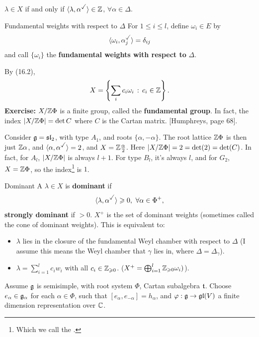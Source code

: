 \documentclass{article}
\begin{document}
\begin{fancylem}{}
    $\lambda \in X$ if and only if $\langle \lambda, \alpha^{\checked} \rangle \in \bbZ$, $\forall \alpha \in \Delta$.
\end{fancylem}
\begin{fancydefine}{Fundamental weights with respect to $\Delta$}
    For $1 \leq i \leq l$, define $\omega_{i} \in E$ by \[ \langle \omega_{i}, \alpha_{j}^{\checked} \rangle = \delta_{ij}\]
    and call $\{ \omega_{i} \}$ the \textbf{fundamental weights with respect to} $\Delta$.
\end{fancydefine}
By (16.2), \[ X= \left\{ \sum_{i} c_{i} \omega_{i} \, : \, c_{i} \in \mathbb{Z}\right\}. \]
\textbf{Exercise: }$X/\mathbb{Z}\Phi$ is a finite group, called the \textbf{fundamental group}. In fact, the index $|X/\mathbb{Z}\Phi| = \det C$ where $C$ is the Cartan matrix. [Humphreys, page 68].
\begin{ex*}
    Consider $\mathfrak{g} = \mathfrak{sl}_{2}$, with type $A_{1}$, and roots $\{\alpha, -\alpha\}$. The root lattice $\mathbb{Z}\Phi$ is then just $\mathbb{Z}\alpha$, and $\langle \alpha, \alpha^{\checked} \rangle = 2$, and $X = \mathbb{Z} \frac{\alpha}{2}$. Here $|X/\mathbb{Z}\Phi|=2=\det(2) = \det(C)$. In fact, for $A_{l}$, $|X/\mathbb{Z}\Phi|$ is always $l+1$. For type $B_{l}$, it's always $l$, and for $G_{2}$, $X=\mathbb{Z}\Phi$, so the index\footnote{Which we call the .} is $1$.
\end{ex*}
\begin{fancydefine}{Dominant}
    A $\lambda \in X$ is \textbf{dominant} if \[
        \langle \lambda, \alpha^{\checked} \rangle \geq 0, \, \, \forall \alpha \in \Phi^{+},\]
        \textbf{strongly dominant} if $>0$. $X^{+}$ is the set of dominant weights (sometimes called the cone of dominant weights). This is equivalent to: \begin{itemize}
            \item $\lambda$ lies in the closure of the fundamental Weyl chamber with respect to $\Delta$ (I assume this means the Weyl chamber that $\gamma$ lies in, where $\Delta = \Delta_{\gamma}$).
            \item $\lambda = \sum_{i=1}^{l} c_{i}w_{i}$ with all $c_{i} \in \mathbb{Z}_{\geqslant 0}$. ($X^{+} = \bigoplus_{i=1}^{l}\mathbb{Z}_{\geqslant 0} \omega_{i})$).
        \end{itemize} 
\end{fancydefine}
Assume $\mathfrak{g}$ is semisimple, with root system $\Phi$, Cartan subalgebra $\mathfrak{t}$. Choose $e_{\alpha} \in \mathfrak{g}_{\alpha}$ for each $\alpha \in \Phi$, such that $[e_{\alpha},e_{-\alpha}]=h_{\alpha}$, and $\varphi: \mathfrak{g} \to \mathfrak{gl}(V)$ a finite dimension representation over $\mathbb{C}$.
\end{document}
